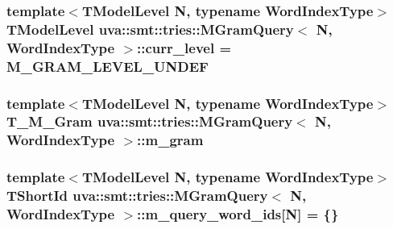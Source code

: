 \subsubsection[{curr\+\_\+level}]{\setlength{\rightskip}{0pt plus 5cm}template$<$T\+Model\+Level N, typename Word\+Index\+Type$>$ {\bf T\+Model\+Level} {\bf uva\+::smt\+::tries\+::\+M\+Gram\+Query}$<$ N, Word\+Index\+Type $>$\+::curr\+\_\+level = M\+\_\+\+G\+R\+A\+M\+\_\+\+L\+E\+V\+E\+L\+\_\+\+U\+N\+D\+E\+F}\label{structuva_1_1smt_1_1tries_1_1_m_gram_query_a18e8f32cf23f0f6b1ccd13acc1025d0b}
\hypertarget{structuva_1_1smt_1_1tries_1_1_m_gram_query_af832570ab51678eb51b440a6af1fff71}{}
\subsubsection[{m\+\_\+gram}]{\setlength{\rightskip}{0pt plus 5cm}template$<$T\+Model\+Level N, typename Word\+Index\+Type$>$ {\bf T\+\_\+\+M\+\_\+\+Gram} {\bf uva\+::smt\+::tries\+::\+M\+Gram\+Query}$<$ N, Word\+Index\+Type $>$\+::m\+\_\+gram}\label{structuva_1_1smt_1_1tries_1_1_m_gram_query_af832570ab51678eb51b440a6af1fff71}
\hypertarget{structuva_1_1smt_1_1tries_1_1_m_gram_query_a338ab0c27946bcf49d7e08328efe4eeb}{}
\subsubsection[{m\+\_\+query\+\_\+word\+\_\+ids}]{\setlength{\rightskip}{0pt plus 5cm}template$<$T\+Model\+Level N, typename Word\+Index\+Type$>$ {\bf T\+Short\+Id} {\bf uva\+::smt\+::tries\+::\+M\+Gram\+Query}$<$ N, Word\+Index\+Type $>$\+::m\+\_\+query\+\_\+word\+\_\+ids\mbox{[}N\mbox{]} = \{\}}\label{structuva_1_1smt_1_1tries_1_1_m_gram_query_a338ab0c27946bcf49d7e08328efe4eeb}
\hypertarget{structuva_1_1smt_1_1tries_1_1_m_gram_query_a17a3df5da9053f4707cbe9ce9022a3a9}{}
